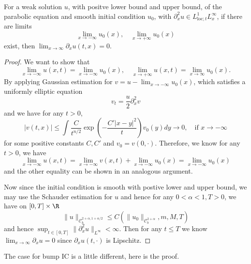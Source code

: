 \begin{lemma}
    For a weak solution $u$, with positve lower bound and upper bound, of the parabolic equation and smooth initial condition $u_0$, with $\partial_x^2 u \in L^1_{\text{loc};t}L^{\infty}_x$, if there are limits
    \[
    \lim_{x\to -\infty} u_0(x),\quad \lim_{x\to +\infty}u_0(x)
    \]
    exist, then $\lim_{x\to \infty} \partial_x u(t,x) = 0$.
\end{lemma}
\begin{proof}
    We want to show that
    \[
        \lim_{x\to-\infty} u(x,t) = \lim_{x\to -\infty} u_0(x),\quad \lim_{x\to+\infty} u(x,t) = \lim_{x\to \infty}u_0(x).
    \]
    By applying Gaussian estimation for $v = u - \lim_{x\to -\infty} u_0(x)$, which satisfies a uniformly elliptic equation
    \[v_t = \dfrac u2 \partial_x^2 v\]
    and we have for any $t>0$,
    \[
        |v(t,x)| \leq \int \dfrac{C}{t^{n/2}}\exp{\left(-\dfrac{C'|x-y|^2}{t}\right)}v_0(y) dy \to 0,\quad\text{if }x\to -\infty
    \]
    for some positive constants $C,C'$ and $v_0 = v(0,\cdot)$. Therefore, we know for any $t>0$, we have
    \[
    \lim_{x\to-\infty} u(x,t) = \lim_{x\to -\infty}v(x,t) + \lim_{x\to -\infty} u_0(x) = \lim_{x\to -\infty} u_0(x)
    \]
    and the other equality can be shown in an analogous argument.\par
    Now since the initial condition is smooth with postive lower and upper bound, we may use the Schauder estimation for $u$ and hence for any $0 < \alpha < 1, T>0$, we have on $[0,T]\times\R$
    \[
    \lVert u\rVert_{\mathcal{C}^{2+\alpha,1+\alpha/2}_b} \leq C(\lVert u_0\rVert_{\mathcal{C}^{2+\alpha}_b},m,M,T)
    \]
    and hence $\sup_{t\in[0,T]} \lVert\partial^2_x u\rVert_{L^{\infty}} < \infty$. Then for any $t \leq T$ we know $\lim_{x\to\infty} \partial_x u = 0$ since $\partial_x u(t,\cdot)$ is Lipschitz.
\end{proof}

The case for bump IC is a little different, here is the proof.

